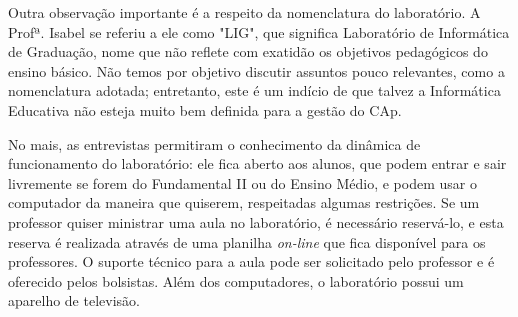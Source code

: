 Outra observação importante é a respeito da nomenclatura do laboratório. A Profª. Isabel se referiu a ele como "LIG", que significa Laboratório de Informática de Graduação, nome que não reflete com exatidão os objetivos pedagógicos do ensino básico. Não temos por objetivo discutir assuntos pouco relevantes, como a nomenclatura adotada; entretanto, este é um indício de que talvez a Informática Educativa não esteja muito bem definida para a gestão do CAp.

No mais, as entrevistas permitiram o conhecimento da dinâmica de funcionamento do laboratório: ele fica aberto aos alunos, que podem entrar e sair livremente se forem do Fundamental II ou do Ensino Médio, e podem usar o computador da maneira que quiserem, respeitadas algumas restrições. Se um professor quiser ministrar uma aula no laboratório, é necessário reservá-lo, e esta reserva é realizada através de uma planilha \textit{on-line} que fica disponível para os professores. O suporte técnico para a aula pode ser solicitado pelo professor e é oferecido pelos bolsistas. Além dos computadores, o laboratório possui um aparelho de televisão.
